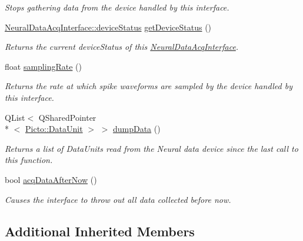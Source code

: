 \begin{DoxyCompactItemize}
\begin{DoxyCompactList}\small\item\em Stops gathering data from the device handled by this interface. \end{DoxyCompactList}\item 
\hypertarget{class_tdt_plugin_a667789ad3f60a934933c1152f84e3b69}{\hyperlink{class_neural_data_acq_interface_a18d2ffb89521e40cba91a159e47fd449}{Neural\-Data\-Acq\-Interface\-::device\-Status} \hyperlink{class_tdt_plugin_a667789ad3f60a934933c1152f84e3b69}{get\-Device\-Status} ()}\label{class_tdt_plugin_a667789ad3f60a934933c1152f84e3b69}

\begin{DoxyCompactList}\small\item\em Returns the current device\-Status of this \hyperlink{class_neural_data_acq_interface}{Neural\-Data\-Acq\-Interface}. \end{DoxyCompactList}\item 
\hypertarget{class_tdt_plugin_a1d7fc20a1026e536cdb96935e170a589}{float \hyperlink{class_tdt_plugin_a1d7fc20a1026e536cdb96935e170a589}{sampling\-Rate} ()}\label{class_tdt_plugin_a1d7fc20a1026e536cdb96935e170a589}

\begin{DoxyCompactList}\small\item\em Returns the rate at which spike waveforms are sampled by the device handled by this interface. \end{DoxyCompactList}\item 
Q\-List$<$ Q\-Shared\-Pointer\\*
$<$ \hyperlink{class_picto_1_1_data_unit}{Picto\-::\-Data\-Unit} $>$ $>$ \hyperlink{class_tdt_plugin_a4491478b3dc7498e73967896a38244c2}{dump\-Data} ()
\begin{DoxyCompactList}\small\item\em Returns a list of Data\-Units read from the Neural data device since the last call to this function. \end{DoxyCompactList}\item 
bool \hyperlink{class_tdt_plugin_abd4555dee2a147e85cc47493bf038a0d}{acq\-Data\-After\-Now} ()
\begin{DoxyCompactList}\small\item\em Causes the interface to throw out all data collected before now. \end{DoxyCompactList}\end{DoxyCompactItemize}
\subsection*{Additional Inherited Members}


